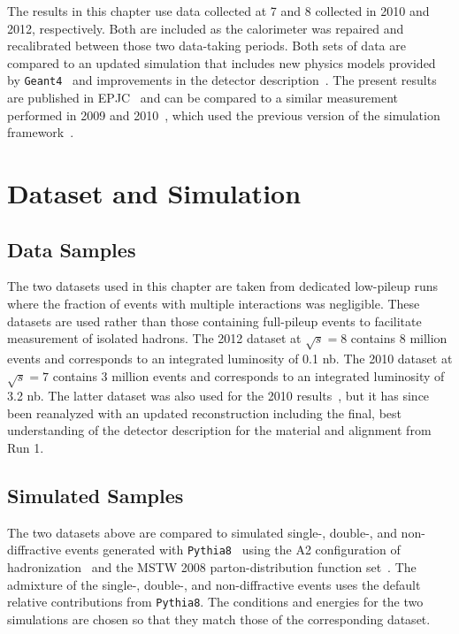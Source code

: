 The results in this chapter use data collected at 7 and 8 \TeV collected in 2010 and 2012, respectively.
Both are included as the calorimeter was repaired and recalibrated between those two data-taking periods.
Both sets of data are compared to an updated simulation that includes new physics models provided by \texttt{Geant4}~\cite{GEANT4} and improvements in the detector description~\cite{PERF-2011-08,PERF-2013-05}.
The present results are published in \ac{EPJC}~\cite{PERF-2015-05} and can be compared to a similar measurement performed in 2009 and 2010~\cite{PERF-2011-05}, which used the previous version of the simulation framework~\cite{SOFT-2010-01}.

\section{Dataset and Simulation}

\subsection{Data Samples}
The two datasets used in this chapter are taken from dedicated low-pileup runs where the fraction of events with multiple interactions was negligible.
These datasets are used rather than those containing full-pileup events to facilitate measurement of isolated hadrons.
The 2012 dataset at $\sqrt{s} = 8$ \TeV contains 8 million events and corresponds to an integrated luminosity of 0.1 nb.
The 2010 dataset at $\sqrt{s} = 7$ \TeV contains 3 million events and corresponds to an integrated luminosity of 3.2 nb.
The latter dataset was also used for the 2010 results~\cite{PERF-2011-05}, but it has since been reanalyzed with an updated reconstruction including the final, best understanding of the detector description for the material and alignment from Run 1.

\subsection{Simulated Samples}
The two datasets above are compared to simulated single-, double-, and non-diffractive events generated with \texttt{Pythia8}~\cite{PYTHIA8} using the A2 configuration of hadronization~\cite{AU2} and the MSTW 2008 parton-distribution function set~\cite{MSTW,MSTW2}.
The admixture of the single-, double-, and non-diffractive events uses the default relative contributions from \texttt{Pythia8}.
The conditions and energies for the two simulations are chosen so that they match those of the corresponding dataset.

